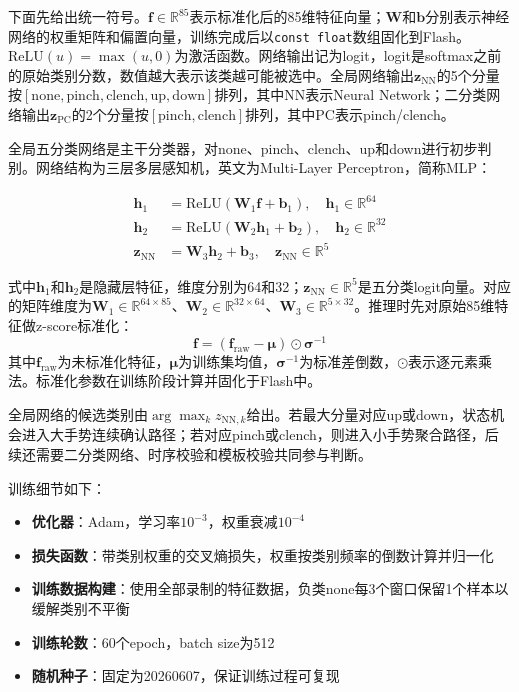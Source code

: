 \documentclass[lettersize,journal]{IEEEtran}
\begin{document}
下面先给出统一符号。$\mathbf{f}\in\mathbb{R}^{85}$表示标准化后的85维特征向量；$\mathbf{W}$和$\mathbf{b}$分别表示神经网络的权重矩阵和偏置向量，训练完成后以\texttt{const float}数组固化到Flash。$\mathrm{ReLU}(u)=\max(u,0)$为激活函数。网络输出记为logit，logit是softmax之前的原始类别分数，数值越大表示该类越可能被选中。全局网络输出$\mathbf{z}_\mathrm{NN}$的5个分量按$[\mathrm{none}, \mathrm{pinch}, \mathrm{clench}, \mathrm{up}, \mathrm{down}]$排列，其中NN表示Neural Network；二分类网络输出$\mathbf{z}_\mathrm{PC}$的2个分量按$[\mathrm{pinch}, \mathrm{clench}]$排列，其中PC表示pinch/clench。

全局五分类网络是主干分类器，对none、pinch、clench、up和down进行初步判别。网络结构为三层多层感知机，英文为Multi-Layer Perceptron，简称MLP：

\begin{equation}
    \begin{aligned}
        \mathbf{h}_1 &= \mathrm{ReLU}(\mathbf{W}_1 \mathbf{f} + \mathbf{b}_1), \quad \mathbf{h}_1 \in \mathbb{R}^{64} \\
        \mathbf{h}_2 &= \mathrm{ReLU}(\mathbf{W}_2 \mathbf{h}_1 + \mathbf{b}_2), \quad \mathbf{h}_2 \in \mathbb{R}^{32} \\
        \mathbf{z}_\mathrm{NN} &= \mathbf{W}_3 \mathbf{h}_2 + \mathbf{b}_3, \quad \mathbf{z}_\mathrm{NN} \in \mathbb{R}^{5}
    \end{aligned}
\end{equation}

式中$\mathbf{h}_1$和$\mathbf{h}_2$是隐藏层特征，维度分别为64和32；$\mathbf{z}_\mathrm{NN}\in\mathbb{R}^{5}$是五分类logit向量。对应的矩阵维度为$\mathbf{W}_1\in\mathbb{R}^{64\times85}$、$\mathbf{W}_2\in\mathbb{R}^{32\times64}$、$\mathbf{W}_3\in\mathbb{R}^{5\times32}$。推理时先对原始85维特征做z-score标准化：
\begin{equation}
    \mathbf{f} = (\mathbf{f}_\mathrm{raw} - \boldsymbol{\mu}) \odot \boldsymbol{\sigma}^{-1}
\end{equation}
其中$\mathbf{f}_\mathrm{raw}$为未标准化特征，$\boldsymbol{\mu}$为训练集均值，$\boldsymbol{\sigma}^{-1}$为标准差倒数，$\odot$表示逐元素乘法。标准化参数在训练阶段计算并固化于Flash中。

全局网络的候选类别由$\arg\max_k z_{\mathrm{NN},k}$给出。若最大分量对应up或down，状态机会进入大手势连续确认路径；若对应pinch或clench，则进入小手势聚合路径，后续还需要二分类网络、时序校验和模板校验共同参与判断。

训练细节如下：
\begin{itemize}[leftmargin=*]
    \item \textbf{优化器}：Adam，学习率$10^{-3}$，权重衰减$10^{-4}$
    \item \textbf{损失函数}：带类别权重的交叉熵损失，权重按类别频率的倒数计算并归一化
    \item \textbf{训练数据构建}：使用全部录制的特征数据，负类none每3个窗口保留1个样本以缓解类别不平衡
    \item \textbf{训练轮数}：60个epoch，batch size为512
    \item \textbf{随机种子}：固定为20260607，保证训练过程可复现
\end{itemize}
\end{document}
